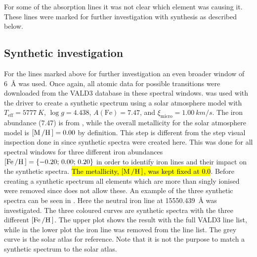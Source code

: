 For some of the absorption lines it was not clear which element was causing it. These lines were
marked for further investigation with synthesis as described below.

\subsection{Synthetic investigation}

For the lines marked above for further investigation an even broader window of \SI{6}{\angstrom} was
used. Once again, all atomic data for possible transitions were downloaded from the VALD3 database
in these spectral windows.  was used with the  driver to create a synthetic
spectrum using a solar atmosphere model with $T_\mathrm{eff}=\SI{5777}{K}$, $\log g=4.438$,
$A(\mathrm{Fe})=7.47$, and $\xi_\mathrm{micro}=\SI{1.00}{km/s}$. The iron abundance (7.47) is from
\citet{Gonzalez2000}, while the overall metallicity for the solar atmosphere model is
$[\ion{M}/\ion{H}]=0.00$ by definition. This step is different from the step visual inspection done
in  since synthetic spectra were created here. This was done for all spectral
windows for three different iron abundances $[\ion{Fe}/\ion{H}]=\{-0.20;\,0.00;\,0.20\}$ in order to
identify iron lines and their impact on the synthetic spectra. \hl{The metallicity,
$[\ion{M}/\ion{H}]$, was kept fixed at 0.0}. Before creating a synthetic spectrum all elements which
are more than singly ionised were removed since  does not allow these. An example of the
three synthetic spectra can be seen in . Here the neutral iron
line at \SI{15550.439}{\angstrom} was investigated. The three coloured curves are synthetic spectra
with the three different $[\ion{Fe}/\ion{H}]$. The upper plot shows the result with the full VALD3
line list, while in the lower plot the iron line was removed from the line list. The grey curve is
the solar atlas for reference. Note that it is not the purpose to match a synthetic spectrum to the
solar atlas.

